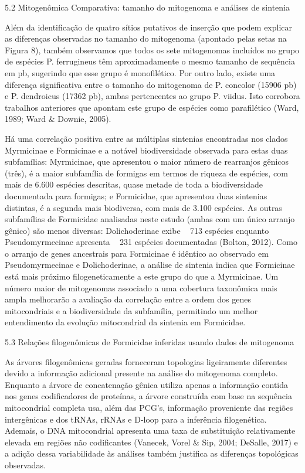 \documentclass[../DISSERTACAO_MAIN.tex]{subfiles}
\begin{document}
	5.2 Mitogenômica Comparativa: tamanho do mitogenoma e análises de sintenia
	
	Além da identificação de quatro sítios putativos de inserção que podem explicar as diferenças observadas no tamanho do mitogenoma (apontado pelas setas na Figura 8), também observamos que todos os sete mitogenomas incluídos no grupo de espécies P. ferrugineus têm aproximadamente o mesmo tamanho de sequência em pb, sugerindo que esse grupo é monofilético. Por outro lado, existe uma diferença significativa entre o tamanho do mitogenoma de P. concolor (15906 pb) e P. dendroicus (17362 pb), ambas pertencentes ao grupo P. viidus. Isto corrobora trabalhos anteriores que apontam este grupo de espécies como parafilético (Ward, 1989; Ward \& Downie, 2005).
	
	Há uma correlação positiva entre as múltiplas sintenias encontradas nos clados Myrmicinae e Formicinae e a notável biodiversidade observada para estas duas subfamílias: Myrmicinae, que apresentou o maior número de rearranjos gênicos (três), é a maior subfamília de formigas em termos de riqueza de espécies, com mais de 6.600 espécies descritas, quase metade de toda a biodiversidade documentada para formigas; e Formicidae, que apresentou duas sintenias distintas, é a segunda mais biodiversa, com mais de 3.100 espécies. As outras subfamílias de Formicidae analisadas neste estudo (ambas com um único arranjo gênico) são menos diversas: Dolichoderinae exibe ~ 713 espécies enquanto Pseudomyrmecinae apresenta ~ 231 espécies documentadas (Bolton, 2012). Como o arranjo de genes ancestrais para Formicinae é idêntico ao observado em Pseudomyrmecinae e Dolichoderinae, a análise de sintenia indica que Formicinae está mais próximo filogeneticamente a este grupo do que a Myrmicinae. Um número maior de mitogenomas associado a uma cobertura taxonômica mais ampla melhorarão a avaliação da correlação entre a ordem dos genes mitocondriais e a biodiversidade da subfamília, permitindo um melhor entendimento da evolução mitocondrial da sintenia em Formicidae.
	
	
	
	5.3 Relações filogenômicas de Formicidae inferidas usando dados de mitogenoma
	
	As árvores filogenômicas geradas forneceram topologias ligeiramente diferentes devido a informação adicional presente na análise do mitogenoma completo. Enquanto a árvore de concatenação gênica utiliza apenas a informação contida nos genes codificadores de proteínas, a árvore construída com base na sequência mitocondrial completa usa, além das PCG’s, informação proveniente das regiões intergênicas e dos tRNAs, rRNAs e D-loop para a inferência filogenética. Ademais, o DNA mitocondrial apresenta uma taxa de substituição relativamente elevada em regiões não codificantes (Vanecek, Vorel \& Sip, 2004; DeSalle, 2017) e a adição dessa variabilidade às análises também justifica as diferenças topológicas observadas.
	
\end{document}
